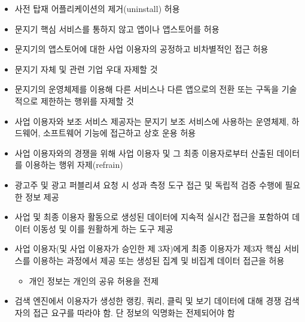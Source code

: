 \begin{itemize}
\begin{itemize}
		\begin{itemize}
		\item 사전 탑재 어플리케이션의 제거(uninstall) 허용
		\item 문지기 핵심 서비스를 통하지 않고 앱이나 앱스토어를 허용
		\item 문지기의 앱스토어에 대한 사업 이용자의 공정하고 비차별적인 접근 허용
		\item 문지기 자체 및 관련 기업 우대 자제할 것
		\item 문지기의 운영체제를 이용해 다른 서비스나 다른 앱으로의 전환 또는 구독을 기술적으로 제한하는 행위를 자제할 것
		\item 사업 이용자와 보조 서비스 제공자는 문지기 보조 서비스에 사용하는 운영체제, 하드웨어, 소프트웨어 기능에 접근하고 상호 운용 허용
		\item 사업 이용자와의 경쟁을 위해 사업 이용자 및 그 최종 이용자로부터 산출된 데이터를 이용하는 행위 자제(refrain)
		\item 광고주 및 광고 퍼블리셔 요청 시 성과 측정 도구 접근 및 독립적 검증 수행에 필요한 정보 제공
		\item 사업 및 최종 이용자 활동으로 생성된 데이터에 지속적 실시간 접근을 포함하여 데이터 이동성 및 이를 원활하게 하는 도구 제공
		\item 사업 이용자(및 사업 이용자가 승인한 제 3자)에게 최종 이용자가 제3자 핵심 서비스를 이용하는 과정에서 제공 또는 생성된 집계 및 비집계 데이터 접근을 허용
			\begin{itemize}
			\item 개인 정보는 개인의 공유 허용을 전제
			\end{itemize}
		\item 검색 엔진에서 이용자가 생성한 랭킹, 쿼리, 클릭 및 보기 데이터에 대해 경쟁 검색자의 접근 요구를 따라야 함. 단 정보의 익명화는 전제되어야 함
		\end{itemize}	
	\end{itemize}
\end{itemize}


